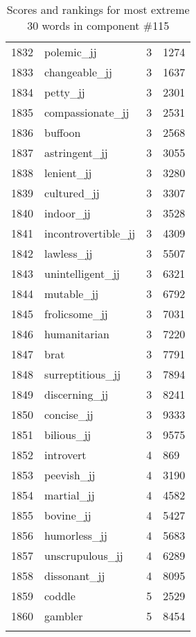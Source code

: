 \begin{longtable}[!htbp]{| rlr@{.}l |}
    1832 & polemic\_jj & 3 & 1274 \\
    1833 & changeable\_jj & 3 & 1637 \\
    1834 & petty\_jj & 3 & 2301 \\
    1835 & compassionate\_jj & 3 & 2531 \\
    1836 & buffoon & 3 & 2568 \\
    1837 & astringent\_jj & 3 & 3055 \\
    1838 & lenient\_jj & 3 & 3280 \\
    1839 & cultured\_jj & 3 & 3307 \\
    1840 & indoor\_jj & 3 & 3528 \\
    1841 & incontrovertible\_jj & 3 & 4309 \\
    1842 & lawless\_jj & 3 & 5507 \\
    1843 & unintelligent\_jj & 3 & 6321 \\
    1844 & mutable\_jj & 3 & 6792 \\
    1845 & frolicsome\_jj & 3 & 7031 \\
    1846 & humanitarian & 3 & 7220 \\
    1847 & brat & 3 & 7791 \\
    1848 & surreptitious\_jj & 3 & 7894 \\
    1849 & discerning\_jj & 3 & 8241 \\
    1850 & concise\_jj & 3 & 9333 \\
    1851 & bilious\_jj & 3 & 9575 \\
    1852 & introvert & 4 & 869 \\
    1853 & peevish\_jj & 4 & 3190 \\
    1854 & martial\_jj & 4 & 4582 \\
    1855 & bovine\_jj & 4 & 5427 \\
    1856 & humorless\_jj & 4 & 5683 \\
    1857 & unscrupulous\_jj & 4 & 6289 \\
    1858 & dissonant\_jj & 4 & 8095 \\
    1859 & coddle & 5 & 2529 \\
    1860 & gambler & 5 & 8454 \\
    \hline
    \caption{Scores and rankings for most extreme 30 words in component \#115} \\
\end{longtable}
